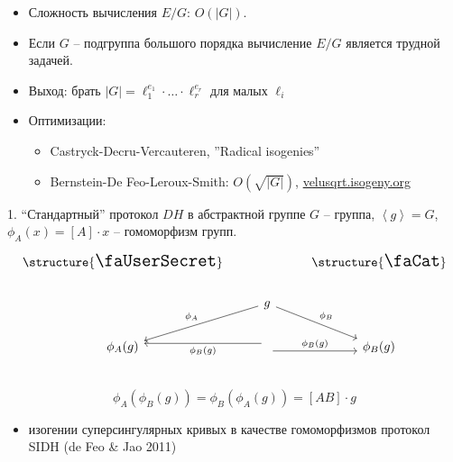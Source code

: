 \documentclass{beamer}
\begin{document}
\begin{frame}
	\begin{itemize}
		\item Сложность вычисления $E/G$: $O(|G|)$.
		\item Если $G$ -- подгруппа большого порядка вычисление $E/G$ является трудной задачей.
		\item Выход: брать $|G| = \ell_1^{e_1} \cdot \ldots \cdot \ell_r^{e_r}$ для малых $\ell_i$
		\item Оптимизации:
		\begin{itemize}
			\item Castryck-Decru-Vercauteren, ''Radical isogenies''
			\item Bernstein-De Feo-Leroux-Smith: $O(\sqrt{|G|})$, \url{velusqrt.isogeny.org}
		\end{itemize}
	\end{itemize}
\end{frame}

\begin{frame}[fragile]{1. ``Стандартный'' протокол $DH$ в абстрактной группе}
	$G$ -- группа, $\left<g\right> = G$, $\phi_A(x) = [A] \cdot x$ -- гомоморфизм групп.
	\[
	\begin{tikzcd}
		\text{\structure{{\Large\faUserSecret}}} & & \text{\structure{{\Large\faCat}}} \\
		& \arrow{ld}[swap]{\phi_A} g \arrow{rd}{\phi_B}  \\
		\phi_A(g) & \arrow[yshift=-0.7ex]{r}{\phi_B(g)} \arrow[yshift=0.7ex]{l}{\phi_B(g)}  & \phi_B(g)\\
	\end{tikzcd}
	\]
	\[
	\phi_A(\phi_B(g)) = \phi_B(\phi_A(g)) = [A B]\cdot g
	\]
	\begin{itemize}
		\item изогении суперсингулярных кривых в качестве гомоморфизмов \structure{$\Rightarrow$} протокол SIDH (de Feo \& Jao 2011)
	\end{itemize}
\end{frame}
\end{document}
